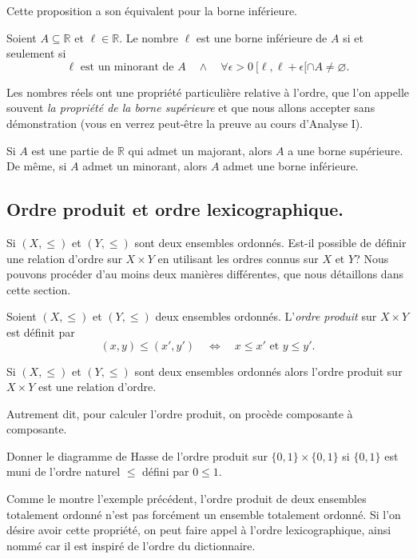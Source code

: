 \documentclass[french,course,oneside,theoremnosection]{lecture}
\newcommand{\R}{\mathbb{R}}
\begin{document}
Cette proposition a son équivalent pour la borne inférieure.
\begin{proposition}
Soient $A\subseteq \R$ et $\ell \in \R$. Le nombre $\ell$ est une borne inférieure de $A$ si et seulement si
\begin{equation}\label{eqn:maj}
\ell \text{ est un minorant de } A \quad \wedge \quad \forall \epsilon >0\  [\ell, \ell+\epsilon[ \cap A \neq \varnothing.
\end{equation}
\end{proposition}

Les nombres réels ont une propriété particulière relative à l'ordre, que l'on appelle souvent \emph{la propriété de la borne supérieure} et que nous allons accepter sans démonstration (vous en verrez peut-être la preuve au cours d'Analyse I).

\begin{theorem}
Si $A$ est une partie de $\R$ qui admet un majorant, alors $A$ a une borne supérieure. De même, si $A$ admet un minorant, alors $A$ admet une borne inférieure.
\end{theorem}

\subsection{Ordre produit et ordre lexicographique.}
Si $(X,\leq)$ et $(Y, \leq)$ sont deux ensembles ordonnés. Est-il possible de définir une relation d'ordre sur $X \times Y$ en utilisant les ordres connus sur $X$ et $Y$? Nous pouvons procéder d'au moins deux manières différentes, que nous détaillons dans cette section.

\begin{definition}
Soient $(X, \leq)$ et $(Y,\leq)$ deux ensembles ordonnés. L'\emph{ordre produit} sur $X\times Y$ est définit par
\[
(x,y) \leq (x',y') \quad \iff \quad x\leq x' \text{ et } y\leq y'.
\]
\end{definition}

\begin{lemma}
Si $(X,\leq)$ et $(Y, \leq)$ sont deux ensembles ordonnés alors l'ordre produit sur $X\times Y$ est une relation d'ordre.
\end{lemma}

Autrement dit, pour calculer l'ordre produit, on procède composante à composante.
\begin{example}
Donner le diagramme de Hasse de l'ordre produit sur $\{0,1\}\times \{0,1\}$ si $\{0,1\}$ est muni de l'ordre naturel $\leq$ défini par $0\leq 1$.
\end{example}
Comme le montre l'exemple précédent, l'ordre produit de deux ensembles totalement ordonné n'est pas forcément un ensemble totalement ordonné. Si l'on désire avoir cette propriété, on peut faire appel à l'ordre lexicographique, ainsi nommé car il est inspiré de l'ordre du dictionnaire.
\end{document}

